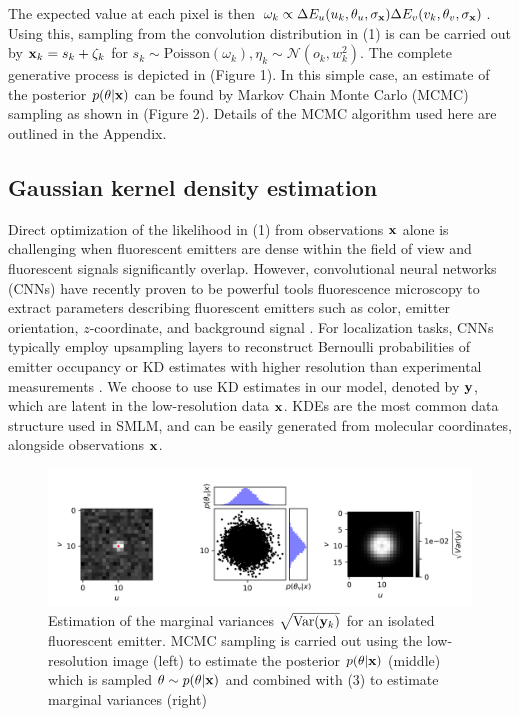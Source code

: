 \documentclass{article}
\begin{document}
The expected value at each pixel is then $\omega_{k}\propto \Delta E_{u}(u_{k},\theta_{u},\sigma_{\bold{x}})\Delta E_{v}(v_{k},\theta_{v},\sigma_{\bold{x}}) $. Using this, sampling from the convolution distribution in (1) is can be carried out by $\bold{x}_{k} = s_{k} + \zeta_{k}$ for $s_{k}\sim \mathrm{Poisson}(\omega_{k}), \eta_{k}\sim \mathcal{N}(o_{k},w_{k}^{2})$. The complete generative process is depicted in (Figure 1). In this simple case, an estimate of the posterior $p(\theta|\bold{x})$ can be found by Markov Chain Monte Carlo (MCMC) sampling as shown in (Figure 2). Details of the MCMC algorithm used here are outlined in the Appendix.

\subsection{Gaussian kernel density estimation}

Direct optimization of the likelihood in (1) from observations $\bold{x}$ alone is challenging when fluorescent emitters are dense within the field of view and fluorescent signals significantly overlap. However, convolutional neural networks (CNNs) have recently proven to be powerful tools fluorescence microscopy to extract parameters describing fluorescent emitters such as color, emitter orientation, $z$-coordinate, and background signal \cite{Zhang2018,Kim2019,Zelger2018}. For localization tasks, CNNs typically employ upsampling layers to reconstruct Bernoulli probabilities of emitter occupancy \citep{Speiser2021} or KD estimates with higher resolution than experimental measurements \citep{Nehme2020}. We choose to use KD estimates in our model, denoted by $\bold{y}$, which are latent in the low-resolution data $\bold{x}$. KDEs are the most common data structure used in SMLM, and can be easily generated from molecular coordinates, alongside observations $\bold{x}$.

\begin{figure}
\includegraphics[scale=0.7]{media/MCMC.png}
\caption{Estimation of the marginal variances $\sqrt{\mathrm{Var}(\bold{y}_k)}$ for an isolated fluorescent emitter. MCMC sampling is carried out using the low-resolution image (left) to estimate the posterior $p(\theta|\bold{x})$ (middle) which is sampled $\theta\sim p(\theta|\bold{x})$ and combined with (3) to estimate marginal variances (right)}
\end{figure}
\end{document}
